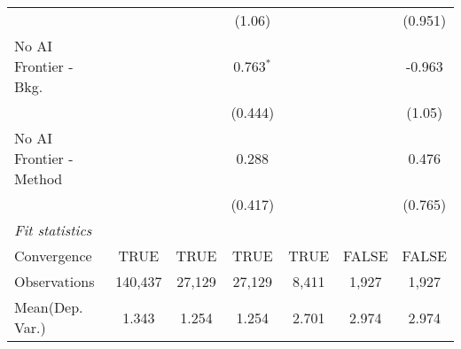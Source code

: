 \begin{tabular}{lcccccc}
                           &               &         & (1.06)      &              &             & (0.951)\\   
   No AI Frontier - Bkg.   &               &         & 0.763$^{*}$ &              &             & -0.963\\   
                           &               &         & (0.444)     &              &             & (1.05)\\   
   No AI Frontier - Method &               &         & 0.288       &              &             & 0.476\\   
                           &               &         & (0.417)     &              &             & (0.765)\\   
   \midrule
   \emph{Fit statistics}\\
   Convergence             &TRUE           & TRUE    & TRUE        & TRUE         & FALSE       & FALSE\\  
   Observations            & 140,437       & 27,129  & 27,129      & 8,411        & 1,927       & 1,927\\  
Mean(Dep. Var.) & 1.343 & 1.254 & 1.254 & 2.701 & 2.974 & 2.974 \\
   

\end{tabular}
